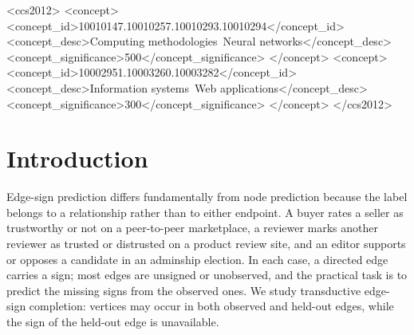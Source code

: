 \documentclass[sigconf]{acmart}
\theoremstyle{plain}
\theoremstyle{definition}
\begin{document}
\begin{CCSXML}
<ccs2012>
   <concept>
       <concept_id>10010147.10010257.10010293.10010294</concept_id>
       <concept_desc>Computing methodologies~Neural networks</concept_desc>
       <concept_significance>500</concept_significance>
       </concept>
   <concept>
       <concept_id>10002951.10003260.10003282</concept_id>
       <concept_desc>Information systems~Web applications</concept_desc>
       <concept_significance>300</concept_significance>
       </concept>
 </ccs2012>
\end{CCSXML}



\maketitle

\section{Introduction}

Edge-sign prediction differs fundamentally from node prediction because the label belongs to a relationship rather than to either endpoint. A buyer rates a seller as trustworthy or not on a peer-to-peer marketplace, a reviewer marks another reviewer as trusted or distrusted on a product review site, and an editor supports or opposes a candidate in an adminship election. In each case, a directed edge carries a sign; most edges are unsigned or unobserved, and the practical task is to predict the missing signs from the observed ones. We study transductive edge-sign completion: vertices may occur in both observed and held-out edges, while the sign of the held-out edge is unavailable.
\end{document}
